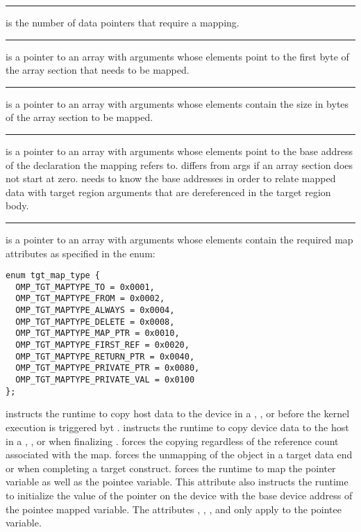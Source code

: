 \noindent\rule{\textwidth}{0.4pt}

 is the number of data pointers that require a mapping.

\noindent\rule{\textwidth}{0.4pt}

 is a pointer to an array with  arguments whose elements point to the first byte of the array section that needs to be mapped.

\noindent\rule{\textwidth}{0.4pt}

 is a pointer to an array with  arguments whose elements contain the size in bytes of the array section to be mapped.

\noindent\rule{\textwidth}{0.4pt}

 is a pointer to an array with  arguments whose elements point to the base address of the declaration the mapping refers to.  differs from args if an array section does not start at zero. \libomptarget{} needs to know the base addresses in order to relate mapped data with target region arguments that are dereferenced in the target region body.

\noindent\rule{\textwidth}{0.4pt}

 is a pointer to an array with  arguments whose elements contain the required map attributes as specified in the enum:
\begin{lstlisting}
enum tgt_map_type {
  OMP_TGT_MAPTYPE_TO = 0x0001,
  OMP_TGT_MAPTYPE_FROM = 0x0002,
  OMP_TGT_MAPTYPE_ALWAYS = 0x0004,
  OMP_TGT_MAPTYPE_DELETE = 0x0008,
  OMP_TGT_MAPTYPE_MAP_PTR = 0x0010,
  OMP_TGT_MAPTYPE_FIRST_REF = 0x0020,
  OMP_TGT_MAPTYPE_RETURN_PTR = 0x0040,
  OMP_TGT_MAPTYPE_PRIVATE_PTR = 0x0080,
  OMP_TGT_MAPTYPE_PRIVATE_VAL = 0x0100
};
\end{lstlisting}

\sloppy
{} instructs the runtime to copy host data to the device in a , , or before the kernel execution is triggered byt .   instructs the runtime to copy  device data to the host in a , , or when finalizing .   forces the copying regardless of the reference count associated with the map.    forces the unmapping of the object in a target data end or when completing a target construct.  forces the runtime to map the pointer variable as well as the pointee variable. This attribute also instructs the runtime to initialize the value of the pointer on the device with the base device address of the pointee mapped variable. The attributes , , , and  only apply to the pointee variable. 

